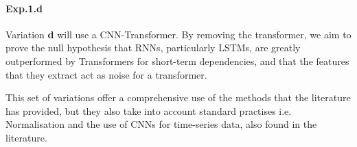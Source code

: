 \paragraph{Exp.1.d}
Variation \textbf{d} will use a CNN-Transformer. By removing the transformer, we aim to prove the null hypothesis that RNNs, particularly LSTMs, are greatly outperformed by Transformers for short-term dependencies,
and that the features that they extract act as noise for a transformer.

This set of variations offer a comprehensive use of the methods that the literature has provided, but they also take into account standard practises i.e. Normalisation and the use of CNNs for time-series data, also found in the literature\cite{math11030676,Xu2025,Manero2018}.